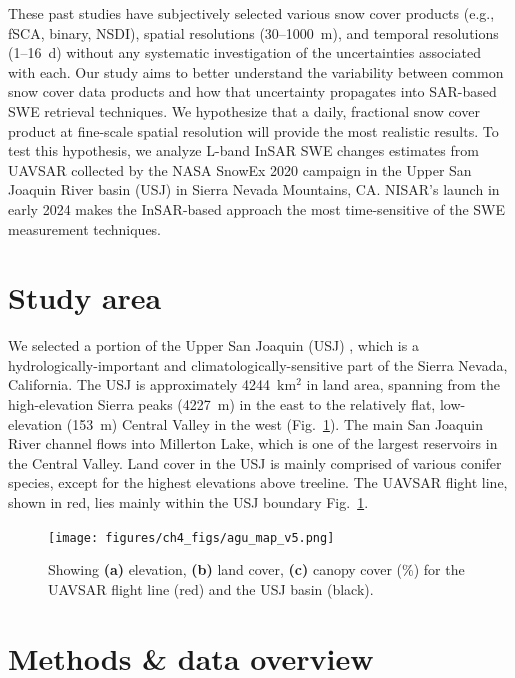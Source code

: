 These past studies have subjectively selected various snow cover products (e.g., fSCA, binary, NSDI), spatial resolutions (30--1000~m), and temporal resolutions (1--16~d) without any systematic investigation of the uncertainties associated with each. Our study aims to better understand the variability between common snow cover data products and how that uncertainty propagates into SAR-based SWE retrieval techniques. We hypothesize that a daily, fractional snow cover product at fine-scale spatial resolution will provide the most realistic results. To test this hypothesis, we analyze L-band InSAR SWE changes estimates from UAVSAR collected by the NASA SnowEx 2020 \citep{marshallNASASnowEx20202019} campaign in the Upper San Joaquin River basin (USJ) in Sierra Nevada Mountains, CA. NISAR's launch in early 2024 makes the InSAR-based approach the most time-sensitive of the SWE measurement techniques.


\hypertarget{ch4-methods}{\section{Study area}\label{ch4-methods}}

We selected a portion of the Upper San Joaquin (USJ) , which is a hydrologically-important and climatologically-sensitive part of the Sierra Nevada, California. The USJ is approximately 4244~km$^{2}$ in land area, spanning from the high-elevation Sierra peaks (4227~m) in the east to the relatively flat, low-elevation (153~m) Central Valley in the west (Fig.~\ref{fig:multisensor_study_area}). The main San Joaquin River channel flows into Millerton Lake, which is one of the largest reservoirs in the Central Valley. Land cover in the USJ is mainly comprised of various conifer species, except for the highest elevations above treeline. The UAVSAR flight line, shown in red, lies mainly within the USJ boundary Fig.~\ref{fig:multisensor_study_area}.

\begin{figure}[ht]
\texttt{[image: figures/ch4\_figs/agu\_map\_v5.png]}
\centering
\caption{Showing \textbf{(a)} elevation, \textbf{(b)} land cover, \textbf{(c)} canopy cover (\%) for the UAVSAR flight line (red) and the USJ basin (black).}
\label{fig:multisensor_study_area}
\end{figure}

\hypertarget{ch4-methods}{\section{Methods \& data overview}\label{ch4-methods}}


